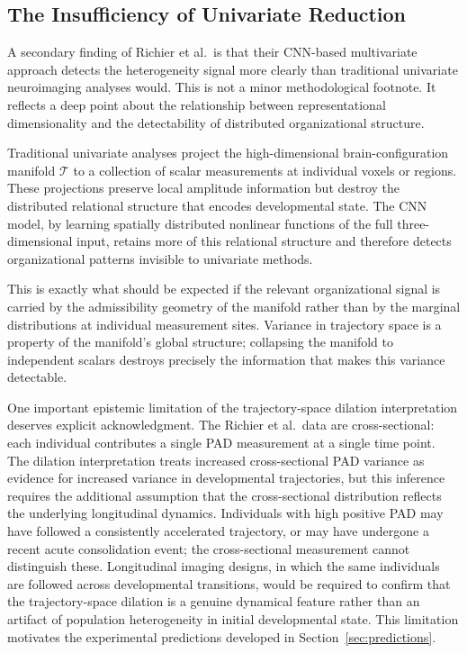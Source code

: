 \documentclass[11pt,a4paper]{article}
\theoremstyle{plain}
\theoremstyle{definition}
\begin{document}
\subsection{The Insufficiency of Univariate Reduction}

A secondary finding of Richier et al.\ is that their CNN-based multivariate approach
detects the heterogeneity signal more clearly than traditional univariate neuroimaging
analyses would. This is not a minor methodological footnote. It reflects a deep point
about the relationship between representational dimensionality and the detectability of
distributed organizational structure.

Traditional univariate analyses project the high-dimensional brain-con\-fig\-u\-ra\-tion manifold
$\mathcal{T}$ to a collection of scalar measurements at individual voxels or regions.
These projections preserve local amplitude information but destroy the distributed
relational structure that encodes developmental state. The CNN model, by learning
spatially distributed nonlinear functions of the full three-dimensional input, retains
more of this relational structure and therefore detects organizational patterns invisible
to univariate methods.

This is exactly what should be expected if the relevant organizational signal is carried
by the admissibility geometry of the manifold rather than by the marginal distributions
at individual measurement sites. Variance in trajectory space is a property of the
manifold's global structure; collapsing the manifold to independent scalars destroys
precisely the information that makes this variance detectable.

One important epistemic limitation of the trajectory-space dilation interpretation
deserves explicit acknowledgment. The Richier et al.\ data are cross-sectional: each
individual contributes a single PAD measurement at a single time point. The dilation
interpretation treats increased cross-sectional PAD variance as evidence for increased
variance in developmental trajectories, but this inference requires the additional
assumption that the cross-sectional distribution reflects the underlying longitudinal
dynamics. Individuals with high positive PAD may have followed a consistently
accelerated trajectory, or may have undergone a recent acute consolidation event; the
cross-sectional measurement cannot distinguish these. Longitudinal imaging designs,
in which the same individuals are followed across developmental transitions, would be
required to confirm that the trajectory-space dilation is a genuine dynamical feature
rather than an artifact of population heterogeneity in initial developmental state.
This limitation motivates the experimental predictions developed in Section~\ref{sec:predictions}.
\end{document}
